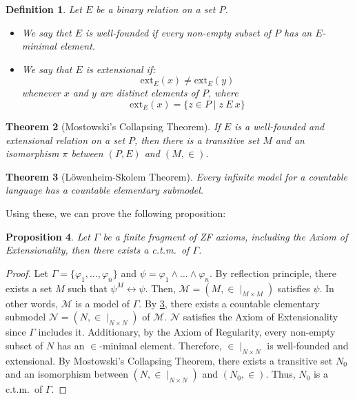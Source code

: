 \documentclass{report}
\newtheorem{thm}{Theorem}[section]
\newtheorem{dfn}[thm]{Definition}
\newtheorem{prop}[thm]{Proposition}
\begin{document}
\begin{dfn}
  Let $E$ be a binary relation on a set $P$.
  \begin{itemize}
    \item 
  We say thet $E$ is \emph{well-founded} if every non-empty subset of $P$ has an $E$-minimal element.
  \item
  We say that $E$ is extensional if:
  $$\mathrm{ext}_E(x) \ne \mathrm{ext}_E(y)$$
  whenever $x$ and $y$ are distinct elements of $P$, 
  where 
  $$\mathrm{ext}_E(x) = \{ z \in P \mid z\ E\ x \}$$ 
\end{itemize}
\end{dfn}

\begin{thm}[Mostowski's Collapsing Theorem]
  If $E$ is a well-founded and extensional relation on a set $P$, 
  then there is a transitive set $M$ and an isomorphism $\pi$ between $(P, E)$ and $(M, \in)$.
\end{thm}

\begin{thm}[L\"owenheim-Skolem Theorem]\label{thm:lowenheim_skolem}
  Every infinite model for a countable language has a countable elementary submodel.
\end{thm}

Using these, we can prove the following proposition:
\begin{prop}\label{prop:ctm_finite}
  Let $\Gamma$ be a finite fragment of ZF axioms, including the Axiom of Extensionality,
  then there exists a c.t.m.\ of $\Gamma$.
\end{prop}
\begin{proof}
  Let $\Gamma = \{ \varphi_1, \ldots, \varphi_n \}$ and $\psi = \varphi_1 \land \ldots \land \varphi_n$.
  By reflection principle, there exists a set $M$ such that $\psi^M \leftrightarrow \psi$.
  Then, $\mathcal{M} = (M, \in \mid_{M \times M})$ satisfies $\psi$. 
  In other words, $\mathcal{M}$ is a model of $\Gamma$.
  By \cref{thm:lowenheim_skolem}, there exists a countable elementary submodel $\mathcal{N} = (N, \in \mid_{N \times N})$ of $\mathcal{M}$.  
  $\mathcal{N}$ satisfies the Axiom of Extensionality since $\Gamma$ includes it.
  Additionary, by the Axiom of Regularity, every non-empty subset of $N$ has an $\in$-minimal element.
  Therefore, $\in \mid_{N \times N}$ is well-founded and extensional.
  By Mostowski's Collapsing Theorem, there exists a transitive set $N_0$ and an isomorphism between $(N, \in \mid_{N \times N})$ and $(N_0, \in)$.
  Thus, $N_0$ is a c.t.m.\ of $\Gamma$.
\end{proof}
\end{document}
